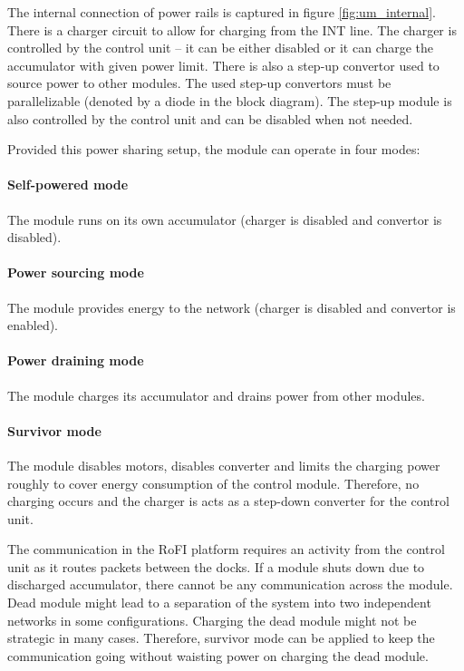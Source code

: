 The internal connection of power rails is captured in figure
\ref{fig:um_internal}. There is a charger circuit to allow for charging from the
INT line. The charger is controlled by the control unit -- it can be either
disabled or it can charge the accumulator with given power limit. There is also
a step-up convertor used to source power to other modules. The used step-up
convertors must be parallelizable (denoted by a diode in the block diagram). The
step-up module is also controlled by the control unit and can be disabled when
not needed.

Provided this power sharing setup, the module can operate in four modes:

\paragraph{Self-powered mode} The module runs on its own accumulator (charger is
disabled and convertor is disabled).

\paragraph{Power sourcing mode} The module provides energy to the network
(charger is disabled and convertor is enabled).

\paragraph{Power draining mode} The module charges its accumulator and drains
power from other modules.

\paragraph{Survivor mode} The module disables motors, disables converter and
limits the charging power roughly to cover energy consumption of the control
module. Therefore, no charging occurs and the charger is acts as a step-down
converter for the control unit.

The communication in the RoFI platform requires an activity from the control
unit as it routes packets between the docks. If a module shuts down due to
discharged accumulator, there cannot be any communication across the module.
Dead module might lead to a separation of the system into two independent
networks in some configurations. Charging the dead module might not be strategic
in many cases. Therefore, survivor mode can be applied to keep the communication
going without waisting power on charging the dead module.

